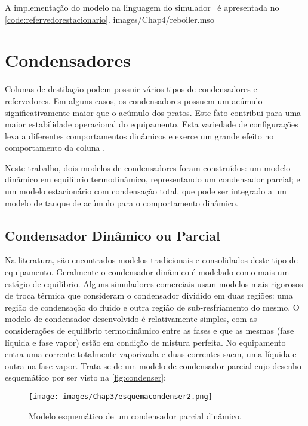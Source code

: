 A implementação do modelo na linguagem do simulador \emso\ é apresentada no
\autoref{code:refervedorestacionario}.
 {images/Chap4/reboiler.mso}

\section{Condensadores}
Colunas de destilação podem possuir vários tipos de condensadores e
refervedores.
Em alguns casos, os condensadores possuem um acúmulo significativamente
maior que o acúmulo dos pratos. Este fato contribui para uma maior estabilidade
operacional do equipamento.
Esta variedade de configurações leva a
diferentes comportamentos dinâmicos e exerce um grande efeito no comportamento da coluna \cite{Kooijman:1995a}.

Neste trabalho, dois modelos de condensadores foram construídos: um modelo
dinâmico em equilíbrio termodinâmico, representando um condensador parcial;
e um modelo estacionário com condensação total, que pode ser integrado a um modelo de tanque
de acúmulo para o comportamento dinâmico.

\subsection{Condensador Dinâmico ou Parcial} \label{sec:modelocondensadordinamico}
Na literatura, são encontrados modelos tradicionais e consolidados deste tipo de equipamento. Geralmente o condensador
dinâmico é
modelado como mais um estágio de equilíbrio. Alguns simuladores comerciais usam modelos mais rigorosos de troca térmica
que consideram o condensador dividido em duas regiões: uma região de condensação do fluido e outra região de
sub-resfriamento do mesmo. O modelo de condensador desenvolvido é relativamente simples, com
as considerações de equilíbrio termodinâmico entre as fases e que as mesmas (fase líquida e fase vapor) estão
em condição de mistura perfeita. No equipamento entra uma corrente totalmente vaporizada e duas correntes saem,
uma líquida e outra na fase vapor. Trata-se de um modelo de condensador parcial cujo desenho esquemático por ser
visto na \autoref{fig:condenser}:

\begin{figure}[htb]
\centering \texttt{[image: images/Chap3/esquemacondenser2.png]}
\caption{Modelo esquemático de um condensador parcial dinâmico.}
\label{fig:condenser}
\end{figure}

